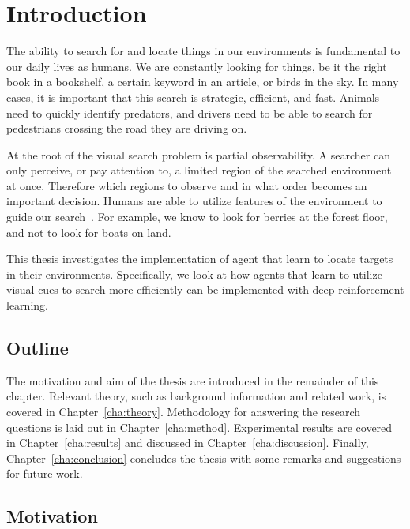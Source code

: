 \chapter{Introduction}
\label{cha:introduction}

The ability to search for and locate things in our environments is fundamental to our daily lives as humans.
We are constantly looking for things, be it the right book in a bookshelf, a certain keyword in an article, or birds in the sky.
In many cases, it is important that this search is strategic, efficient, and fast.
Animals need to quickly identify predators, and drivers need to be able to search for pedestrians crossing the road they are driving on.

At the root of the visual search problem is partial observability.
A searcher can only perceive, or pay attention to, a limited region of the searched environment at once.
Therefore which regions to observe and in what order becomes an important decision. 
Humans are able to utilize features of the environment to guide our search~\cite{wolfe_five_2017,eckstein_visual_2011,nakayama_situating_2011}.
For example, we know to look for berries at the forest floor, and not to look for boats on land.

This thesis investigates the implementation of agent that learn to locate targets in their environments.
Specifically, we look at how agents that learn to utilize visual cues to search more efficiently can be implemented with deep reinforcement learning.

\section{Outline}
\label{sec:outline}

The motivation and aim of the thesis are introduced in the remainder of this chapter. 
Relevant theory, such as background information and related work, is covered in Chapter~\ref{cha:theory}.
Methodology for answering the research questions is laid out in Chapter~\ref{cha:method}.
Experimental results are covered in Chapter~\ref{cha:results} and discussed in Chapter~\ref{cha:discussion}.
Finally, Chapter~\ref{cha:conclusion} concludes the thesis with some remarks and suggestions for future work.

\section{Motivation}
\label{sec:motivation}

